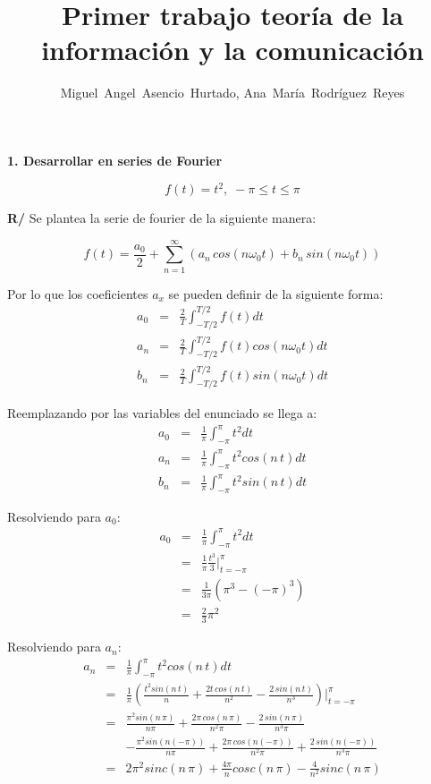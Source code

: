 \documentclass[twocolumn]{article}
\title{Primer trabajo teoría de la información y la comunicación}
\author{Miguel~Angel~Asencio~Hurtado, Ana~María~Rodríguez~Reyes}
\begin{document}
\maketitle
\textbf{1. Desarrollar en series de Fourier}

$$f(t) = t^2,\; -\pi \leq t \leq \pi$$

\textbf{R/} Se plantea la serie de fourier de la siguiente manera:

$$f(t) = \frac{a_0}{2} + \sum_{n=1}^\infty\left(a_n\,cos(n\omega_0t) + b_n\,sin(n\omega_0t)\right)$$

Por lo que los coeficientes $a_x$ se pueden definir de la siguiente forma:
\begin{eqnarray*}
a_0 &=& \frac{2}{T}\int_{-T/2}^{T/2}f(t)dt\\
a_n &=& \frac{2}{T}\int_{-T/2}^{T/2}f(t)cos(n\omega_0t)dt\\
b_n &=& \frac{2}{T}\int_{-T/2}^{T/2}f(t)sin(n\omega_0t)dt
\end{eqnarray*}

Reemplazando por las variables del enunciado se llega a:
\begin{eqnarray*}
a_0 &=& \frac{1}{\pi}\int_{-\pi}^{\pi}t^2dt\\
a_n &=& \frac{1}{\pi}\int_{-\pi}^{\pi}t^2cos(n\,t)dt\\
b_n &=& \frac{1}{\pi}\int_{-\pi}^{\pi}t^2sin(n\,t)dt
\end{eqnarray*}

Resolviendo para $a_0$:
\begin{eqnarray*}
a_0 &=& \frac{1}{\pi}\int_{-\pi}^{\pi}t^2dt\\
&=& \frac{1}{\pi} \frac{t^3}{3}\bigg|_{t=-\pi}^{\pi}\\
&=& \frac{1}{3\pi} (\pi^3 - (-\pi)^3)\\
&=& \frac{2}{3}\pi^2
\end{eqnarray*}

Resolviendo para $a_n$:
\begin{eqnarray*}
a_n &=& \frac{1}{\pi}\int_{-\pi}^{\pi}t^2cos(n\,t)dt\\
&=& \frac{1}{\pi} \left(\frac{t^2sin(n\,t)}{n} + \frac{2t\,cos(n\,t)}{n^2} - \frac{2\,sin(n\,t)}{n^3}\right)\bigg|_{t=-\pi}^{\pi}\\
&=& \frac{\pi^2sin(n\,\pi)}{n\pi} + \frac{2\pi\,cos(n\,\pi)}{n^2\pi} - \frac{2\,sin(n\,\pi)}{n^3\pi}\\
& &- \frac{\pi^2sin(n(-\pi))}{n\pi} + \frac{2\pi\,cos(n(-\pi))}{n^2\pi} + \frac{2\,sin(n(-\pi))}{n^3\pi}\\
&=& 2\pi^2 sinc(n\,\pi) + \frac{4\pi}{n}cosc(n\,\pi) - \frac{4}{n^2}sinc(n\,\pi)
\end{eqnarray*}
\end{document}

